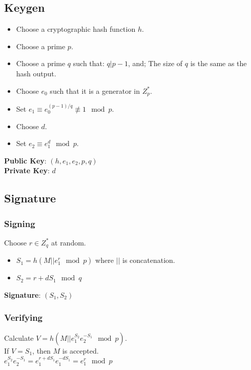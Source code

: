 \documentclass{report}
\begin{document}
		\subsection{Keygen}
			\begin{itemize}
				\item Choose a cryptographic hash function $h$.
				\item Choose a prime $p$.
				\item Choose a prime $q$ such that:
					\subitem $q|p-1$, and;
					\subitem The size of $q$ is the same as the hash output.
				\item Choose $e_0$ such that it is a generator in $Z_p^*$.
				\item Set $e_1 \equiv e_0^{(p-1)/q} \not\equiv 1 \mod p$.
				\item Choose $d$.
				\item Set $e_2 \equiv e_1^d \mod p$.
			\end{itemize}
			\textbf{Public Key}: $(h,e_1,e_2,p,q)$\\
			\textbf{Private Key}: $d$

		\subsection{Signature}
			\subsubsection{Signing}
				Choose $r \in Z_q^*$ at random.
				\begin{itemize}
					\item $S_1=h(M||e_1^r \mod p)$ where $||$ is concatenation.
					\item $S_2=r+dS_1 \mod q$
				\end{itemize}
				\textbf{Signature}: $(S_1,S_2)$
			
			\subsubsection{Verifying}
				Calculate $V=h(M||e_1^{S_2}e_2^{-S_1} \mod p)$.\\
				If $V=S_1$, then $M$ is accepted.\\
				\begin{math}
					e_1^{S_2}e_2^{-S_1}=e_1^{r+dS_1}e_1^{-dS_1}=e_1^r \mod p
				\end{math}
\end{document}
